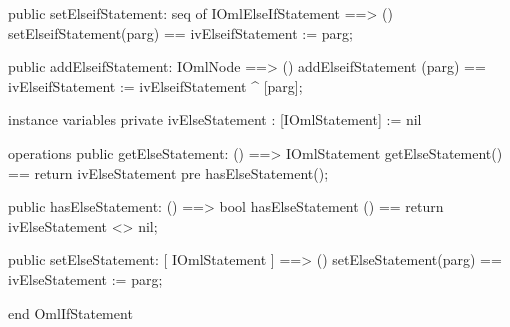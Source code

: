 \begin{vdm_al}
  public setElseifStatement: seq of IOmlElseIfStatement ==> ()
  setElseifStatement(parg) == ivElseifStatement := parg;

  public addElseifStatement: IOmlNode ==> ()
  addElseifStatement (parg) == ivElseifStatement := ivElseifStatement ^ [parg];

instance variables
  private ivElseStatement : [IOmlStatement] := nil

operations
  public getElseStatement: () ==> IOmlStatement
  getElseStatement() == return ivElseStatement
    pre hasElseStatement();

  public hasElseStatement: () ==> bool
  hasElseStatement () == return ivElseStatement <> nil;

  public setElseStatement: [ IOmlStatement ] ==> ()
  setElseStatement(parg) == ivElseStatement := parg;

end OmlIfStatement
\end{vdm_al}


